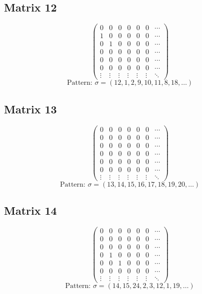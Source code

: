 \documentclass{article}
\begin{document}
\subsection*{Matrix 12}
\[
\begin{pmatrix}
  0 & 0 & 0 & 0 & 0 & 0 & \cdots \\
  1 & 0 & 0 & 0 & 0 & 0 & \cdots \\
  0 & 1 & 0 & 0 & 0 & 0 & \cdots \\
  0 & 0 & 0 & 0 & 0 & 0 & \cdots \\
  0 & 0 & 0 & 0 & 0 & 0 & \cdots \\
  0 & 0 & 0 & 0 & 0 & 0 & \cdots \\
\vdots & \vdots & \vdots & \vdots & \vdots & \vdots & \ddots
\end{pmatrix}
\]
\[
\text{Pattern: } \sigma = (12, 1, 2, 9, 10, 11, 8, 18, \ldots)
\]
\vspace{0.5em}

\subsection*{Matrix 13}
\[
\begin{pmatrix}
  0 & 0 & 0 & 0 & 0 & 0 & \cdots \\
  0 & 0 & 0 & 0 & 0 & 0 & \cdots \\
  0 & 0 & 0 & 0 & 0 & 0 & \cdots \\
  0 & 0 & 0 & 0 & 0 & 0 & \cdots \\
  0 & 0 & 0 & 0 & 0 & 0 & \cdots \\
  0 & 0 & 0 & 0 & 0 & 0 & \cdots \\
\vdots & \vdots & \vdots & \vdots & \vdots & \vdots & \ddots
\end{pmatrix}
\]
\[
\text{Pattern: } \sigma = (13, 14, 15, 16, 17, 18, 19, 20, \ldots)
\]
\vspace{0.5em}

\subsection*{Matrix 14}
\[
\begin{pmatrix}
  0 & 0 & 0 & 0 & 0 & 0 & \cdots \\
  0 & 0 & 0 & 0 & 0 & 0 & \cdots \\
  0 & 0 & 0 & 0 & 0 & 0 & \cdots \\
  0 & 1 & 0 & 0 & 0 & 0 & \cdots \\
  0 & 0 & 1 & 0 & 0 & 0 & \cdots \\
  0 & 0 & 0 & 0 & 0 & 0 & \cdots \\
\vdots & \vdots & \vdots & \vdots & \vdots & \vdots & \ddots
\end{pmatrix}
\]
\[
\text{Pattern: } \sigma = (14, 15, 24, 2, 3, 12, 1, 19, \ldots)
\]
\vspace{0.5em}
\end{document}
